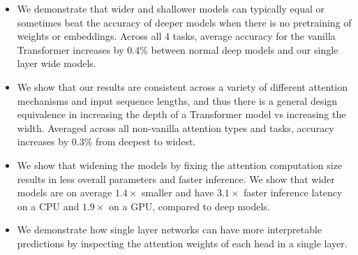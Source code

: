 \begin{itemize}
    \item We demonstrate that wider and shallower models can typically equal or sometimes beat the accuracy of deeper models when there is no pretraining of weights or embeddings. Across all 4 tasks, average accuracy for the vanilla Transformer increases by 0.4\% between normal deep models and our single layer wide models.

    \item We show that our results are consistent across a variety of different attention mechanisms and input sequence lengths, and thus there is a general design equivalence in increasing the depth of a Transformer model vs increasing the width. Averaged across all non-vanilla attention types and tasks, accuracy increases by 0.3\% from deepest to widest.

    \item We show that widening the models by fixing the attention computation size results in less overall parameters and faster inference. We show that wider models are on average $1.4 \times$ smaller and have $3.1 \times$ faster inference latency on a CPU and $1.9 \times$ on a GPU, compared to deep models.

    \item We demonstrate how single layer networks can have more interpretable predictions by inspecting the attention weights of each head in a single layer.
\end{itemize}

